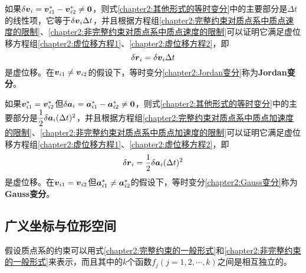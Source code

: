 如果$\delta \boldsymbol{v}_i = \boldsymbol{v}_{i1}^*-\boldsymbol{v}_{i2}^*\neq \boldsymbol{0}$，则式\eqref{chapter2:其他形式的等时变分}中的主要部分是$\Delta t$的线性项，它等于$\delta\boldsymbol{v}_i\Delta t$，并且根据方程组\eqref{chapter2:完整约束对质点系中质点速度的限制}、\eqref{chapter2:非完整约束对质点系中质点速度的限制}可以证明它满足虚位移方程组\eqref{chapter2:虚位移方程1}、\eqref{chapter2:虚位移方程2}，即
\begin{equation}
	\delta \boldsymbol{r}_i = \delta \boldsymbol{v}_i\Delta t \label{chapter2:Jordan变分}
\end{equation}
是虚位移。在$\boldsymbol{v}_{i1}\neq \boldsymbol{v}_{i2}$的假设下，等时变分\eqref{chapter2:Jordan变分}称为{\bf Jordan变分}。

如果$\boldsymbol{v}_{i1}^*=\boldsymbol{v}_{i2}^*$但$\delta \boldsymbol{a}_i = \boldsymbol{a}_{i1}^*-\boldsymbol{a}_{i2}^*\neq \boldsymbol{0}$，则式\eqref{chapter2:其他形式的等时变分}中的主要部分是$\dfrac12 \delta\boldsymbol{a}_i(\Delta t)^2$，并且根据方程组\eqref{chapter2:完整约束对质点系中质点加速度的限制}、\eqref{chapter2:非完整约束对质点系中质点加速度的限制}可以证明它满足虚位移方程组\eqref{chapter2:虚位移方程1}、\eqref{chapter2:虚位移方程2}，即
\begin{equation}
	\delta \boldsymbol{r}_i = \frac12 \delta \boldsymbol{a}_i(\Delta t)^2 \label{chapter2:Gauss变分}
\end{equation}
是虚位移。在$\boldsymbol{v}_{i1}=\boldsymbol{v}_{i2}$但$\boldsymbol{a}_{i1}^*\neq \boldsymbol{a}_{i2}^*$的假设下，等时变分\eqref{chapter2:Gauss变分}称为{\bf Gauss变分}。


\subsection{广义坐标与位形空间}\label{chapter2:subsection-广义坐标与位形空间}

假设质点系的约束可以用式\eqref{chapter2:完整约束的一般形式}和\eqref{chapter2:非完整约束的一般形式}来表示，而且其中的$k$个函数$f_j(j=1,2,\cdots,k)$之间是相互独立的。

